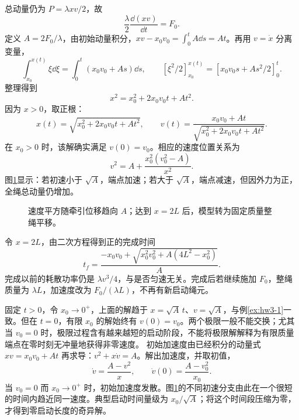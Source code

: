 \begin{solution}
总动量仍为 $P=\lambda xv/2$，故
\[
\frac\lambda2\frac{\dd(xv)}{\dd t}=F_0.
\]
定义 $A=2F_0/\lambda$，由初始动量积分，$xv-x_0v_0=\int_0^t A\dd s=At$。再用 $v=\dot x$ 分离变量，
\[
\int_{x_0}^{x(t)}\xi\dd\xi=\int_0^t(x_0v_0+As)\dd s,
\qquad [\xi^2/2]_{x_0}^{x(t)}=[x_0v_0s+As^2/2]_0^t.
\]
整理得到
\[
x^2=x_0^2+2x_0v_0t+At^2.
\]
因为 $x>0$，取正根：
\[
x(t)=\sqrt{x_0^2+2x_0v_0t+At^2},\qquad
v(t)=\frac{x_0v_0+At}{\sqrt{x_0^2+2x_0v_0t+At^2}}.
\]
在 $x_0>0$ 时，该解确实满足 $v(0)=v_0$。相应的速度位置关系为
\[
v^2=A+\frac{x_0^2(v_0^2-A)}{x^2}.
\]
图\ref{deep3:fig:d3-h6-s}显示：若初速小于 $\sqrt A$，端点加速；若大于 $\sqrt A$，端点减速，但因外力为正，全绳总动量仍增加。
\begin{figure}[H]\centering
{}
\caption{速度平方随牵引位移趋向 $A$；达到 $x=2L$ 后，模型转为固定质量整绳平移。}\label{deep3:fig:d3-h6-s}
\end{figure}
令 $x=2L$，由二次方程得到正的完成时间
\[
t_f=\frac{-x_0v_0+\sqrt{x_0^2v_0^2+A(4L^2-x_0^2)}}A.
\]
完成以前的耗散功率仍是 $\lambda v^3/4$，与是否匀速无关。完成后若继续施加 $F_0$，整绳质量为 $\lambda L$，加速度改为 $F_0/(\lambda L)$，不再有新启动绳元。

固定 $t>0$，令 $x_0\to0^+$，上面的解趋于 $x=\sqrt A\,t$、$v=\sqrt A$，与例\ref{ex:hw3-1}一致。但在 $t=0$，有限 $x_0$ 的解始终有 $v(0)=v_0$。两个极限一般不能交换；尤其当 $v_0=0$ 时，极限过程含有越来越短的启动阶段，不能将极限解解释为有限质量端点在零时刻无冲量地获得非零速度。
初始加速度由已经积分的动量式 $xv=x_0v_0+At$ 再求导：$v^2+x\dot v=A$。解出加速度，并取初值，
\[
\dot v=\frac{A-v^2}{x},\qquad
\dot v(0)=\frac{A-v_0^2}{x_0}.
\]
当 $v_0=0$ 而 $x_0\to0^+$ 时，初始加速度发散。图\ref{deep3:fig:d3-h6-s}的不同初速分支由此在一个很短的时间内趋近同一速度。典型启动时间量级为 $x_0/\sqrt A$；将这个时间段压缩为零，才得到零启动长度的奇异解。

\end{solution}


